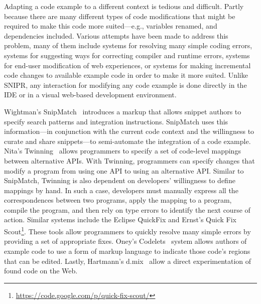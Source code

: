 Adapting a code example to a different context is tedious and difficult. Partly because there are many different types of code modifications that might be required to make this code more suited---e.g., variables renamed, and dependencies included. Various attempts have been made to address this problem, many of them include systems for resolving many simple coding errors, systems for suggesting ways for correcting compiler and runtime errors, systems for end-user modification of web experiences, or systems for making incremental code changes to available example code in order to make it more suited. Unlike \uppercase{SnipR}, any interaction for modifying any code example is done directly in the IDE or in a visual web-based development environment.  

Wightman's SnipMatch~\cite{Wightman:2012gc} introduces a markup that allows snippet authors to specify search patterns and integration instructions. SnipMatch uses this information---in conjunction with the current code context and the willingness to curate and share snippets---to semi-automate the integration of a code example. Nita's Twinning~\cite{Nita:2010en} allows programmers to specify a set of code-level mappings between alternative APIs. With Twinning, programmers can specify changes that modify a program from using one API to using an alternative API. Similar to SnipMatch, Twinning is also dependent on developers' willingness to define mappings by hand. In such a case, developers must manually express all the correspondences between two programs, apply the mapping to a program, compile the program, and then rely on type errors to identify the next course of action.  Similar systems include the Eclipse QuickFix and Ernst's Quick Fix Scout\footnote{\url{https://code.google.com/p/quick-fix-scout/}}. These tools allow programmers to quickly resolve many simple errors by providing a set of appropriate fixes. Oney's Codelets~\cite{Oney:2012ge} system allows authors of example code to use a form of markup language to indicate those code's regions that can be edited. Lastly, Hartmann's d.mix~\cite{Hartmann:2007wf} allow a direct experimentation of found code on the Web.

